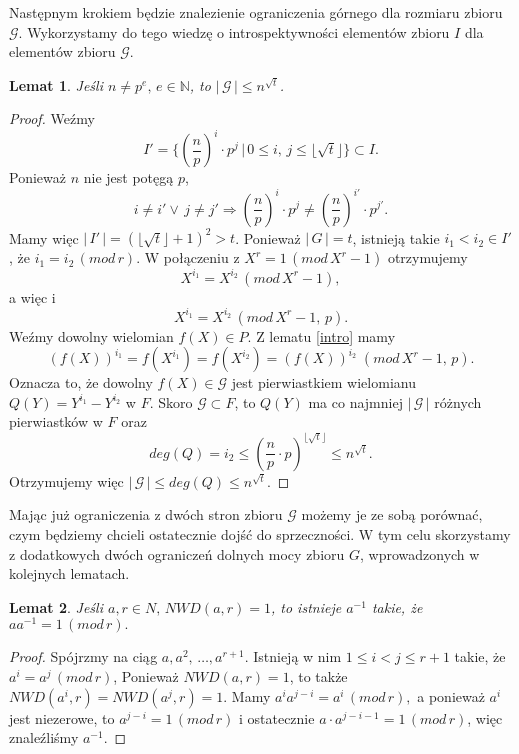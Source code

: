 \documentclass[polish,declaration,shortabstract]{iithesis}
\theoremstyle{definition}
\theoremstyle{remark} \newtheorem{observation}{Obserwacja}
\theoremstyle{plain} \newtheorem{theorem}{Twierdzenie}
\theoremstyle{plain} \newtheorem{lemma}{Lemat}
\theoremstyle{remark} \newtheorem*{remark*}{Uwaga}
\theoremstyle{reminder} \newtheorem*{reminder*}{Przypomnienie}
\begin{document}
Następnym krokiem będzie znalezienie ograniczenia górnego dla rozmiaru zbioru $\mathcal{G}$. Wykorzystamy do tego wiedzę o introspektywności elementów zbioru $I$ dla elementów zbioru $\mathcal{G}$.

\begin{lemma} \label{upper}
	Jeśli $n \neq p^e, \, e \in \mathbb{N}$, to $| \, \mathcal{G} \, | \leq n^{\sqrt{t}}$.
\end{lemma}
	
\begin{proof}
	Weźmy \[I' = \{(\frac{n}{p})^i \cdot p^j \, | \, 0 \leq i, \, j \leq \lfloor \sqrt{t} \rfloor \} \subset I.\] Ponieważ $n$ nie jest potęgą $p$, \[i \neq i' \vee \, j \neq j' \Rightarrow (\frac{n}{p})^i \cdot p^j \neq (\frac{n}{p})^{i'} \cdot p^{j'}.\] Mamy więc $| \, I' \, | = (\lfloor \sqrt{t} \rfloor + 1)^2 > t$. Ponieważ $| \, G \, | = t$, istnieją takie ${i_1 < i_2 \in I'}$, że $i_1 = i_2 \, (mod \, r)$. W połączeniu z $X^r = 1 \, (mod \, X^r - 1)$ otrzymujemy \[X^{i_1} = X^{i_2} \, (mod \, X^r - 1),\] a więc i \[X^{i_1} = X^{i_2} \, (mod \, X^r - 1, \, p).\]  Weźmy dowolny wielomian $f(X) \in P$. Z lematu \ref{intro} mamy \[(f(X))^{i_1} = f(X^{i_1}) = f(X^{i_2}) = (f(X))^{i_2} \; (mod \,  X^r - 1, \, p).\] Oznacza to, że dowolny $f(X) \in \mathcal{G}$ jest pierwiastkiem wielomianu $Q(Y) = Y^{i_1} - Y^{i_2}$ w $F$. Skoro $\mathcal{G} \subset F$, to $Q(Y)$ ma co najmniej $| \, \mathcal{G} \, |$ różnych pierwiastków w $F$ oraz \[deg(Q) = i_2 \leq (\frac{n}{p} \cdot p)^{\lfloor \sqrt{t} \rfloor} \leq n^{\sqrt{t}}.\] Otrzymujemy więc $| \, \mathcal{G} \, | \leq deg(Q) \leq n^{\sqrt{t}}$.
\end{proof}

Mając już ograniczenia z dwóch stron zbioru $\mathcal{G}$ możemy je ze sobą porównać, czym będziemy chcieli ostatecznie dojść do sprzeczności. W tym celu skorzystamy z dodatkowych dwóch ograniczeń dolnych mocy zbioru $G$, wprowadzonych w kolejnych lematach.

\begin{lemma}\label{odwrotny}
	Jeśli $a, r \in N, \, NWD(a, r) = 1$, to istnieje $a^{-1}$ takie, że $aa^{-1} = 1 \, (mod \, r).$
\end{lemma}
	
\begin{proof}
	Spójrzmy na ciąg $a, a^2, \, \dots, a^{r+1}$. Istnieją w nim $1 \leq i < j \leq r + 1$ takie, że $a^i = a^j \, (mod \, r)$, Ponieważ $NWD(a, r) = 1$, to także $NWD(a^i, r) = NWD(a^j, r) = 1$. Mamy $a^ia^{j-i} = a^i \, (mod \, r),$ a ponieważ $a^i$ jest niezerowe, to $a^{j - i} = 1 \, (mod \, r)$ i ostatecznie $a \cdot a^{j - i - 1} = 1 \, (mod \, r)$, więc znaleźliśmy $a^{-1}$.
\end{proof}
\end{document}
